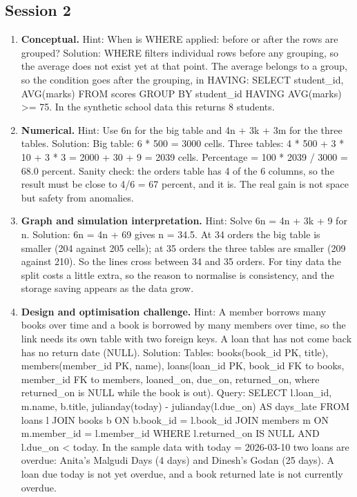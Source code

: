 \documentclass[11pt,a4paper]{article}
\begin{document}
\subsection*{Session 2}
\begin{enumerate}[nosep]
\item \textbf{Conceptual.} Hint: When is WHERE applied: before or after the rows are grouped? Solution: WHERE filters individual rows before any grouping, so the average does not exist yet at that point. The average belongs to a group, so the condition goes after the grouping, in HAVING: SELECT student\_id, AVG(marks) FROM scores GROUP BY student\_id HAVING AVG(marks) \textgreater{}= 75. In the synthetic school data this returns 8 students.
\item \textbf{Numerical.} Hint: Use 6n for the big table and 4n + 3k + 3m for the three tables. Solution: Big table: 6 * 500 = 3000 cells. Three tables: 4 * 500 + 3 * 10 + 3 * 3 = 2000 + 30 + 9 = 2039 cells. Percentage = 100 * 2039 / 3000 = 68.0 percent. Sanity check: the orders table has 4 of the 6 columns, so the result must be close to 4/6 = 67 percent, and it is. The real gain is not space but safety from anomalies.
\item \textbf{Graph and simulation interpretation.} Hint: Solve 6n = 4n + 3k + 9 for n. Solution: 6n = 4n + 69 gives n = 34.5. At 34 orders the big table is smaller (204 against 205 cells); at 35 orders the three tables are smaller (209 against 210). So the lines cross between 34 and 35 orders. For tiny data the split costs a little extra, so the reason to normalise is consistency, and the storage saving appears as the data grow.
\item \textbf{Design and optimisation challenge.} Hint: A member borrows many books over time and a book is borrowed by many members over time, so the link needs its own table with two foreign keys. A loan that has not come back has no return date (NULL). Solution: Tables: books(book\_id PK, title), members(member\_id PK, name), loans(loan\_id PK, book\_id FK to books, member\_id FK to members, loaned\_on, due\_on, returned\_on, where returned\_on is NULL while the book is out). Query: SELECT l.loan\_id, m.name, b.title, julianday(today) - julianday(l.due\_on) AS days\_late FROM loans l JOIN books b ON b.book\_id = l.book\_id JOIN members m ON m.member\_id = l.member\_id WHERE l.returned\_on IS NULL AND l.due\_on \textless{} today. In the sample data with today = 2026-03-10 two loans are overdue: Anita's Malgudi Days (4 days) and Dinesh's Godan (25 days). A loan due today is not yet overdue, and a book returned late is not currently overdue.
\end{enumerate}
\end{document}
